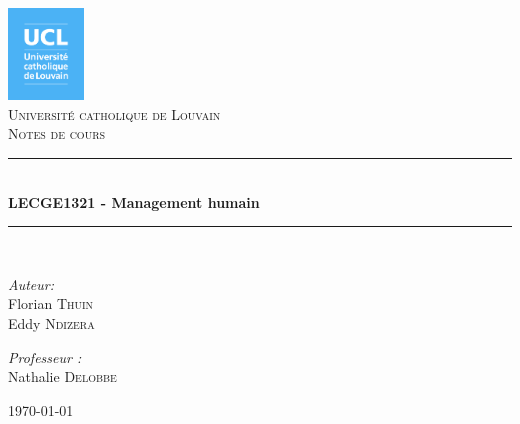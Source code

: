 \documentclass[12pt]{article}
\newcommand{\HRule}{\rule{\linewidth}{0.5mm}}
\begin{document}
\begin{titlepage}
\begin{center}

\includegraphics[width=0.15\textwidth]{./logo_ucl.png}~\\[1cm]

\textsc{\LARGE Université catholique de Louvain}\\[1.5cm]

\textsc{\Large Notes de cours}\\[0.5cm]

\HRule \\[0.4cm]
{ \huge \bfseries LECGE1321 - Management humain \\[0.4cm] }

\HRule \\[1.5cm]

\noindent
\begin{minipage}[t]{0.4\textwidth}
\begin{flushleft} \large
\emph{Auteur:}\\
Florian \textsc{Thuin} \\
Eddy \textsc{Ndizera}
\end{flushleft}
\end{minipage}%
\begin{minipage}[t]{0.4\textwidth}
\begin{flushright} \large
\emph{Professeur :} \\
Nathalie \textsc{Delobbe}
\end{flushright}
\end{minipage}

\vfill

{\large \today}

\end{center}
\end{titlepage}

\tableofcontents
\end{document}

